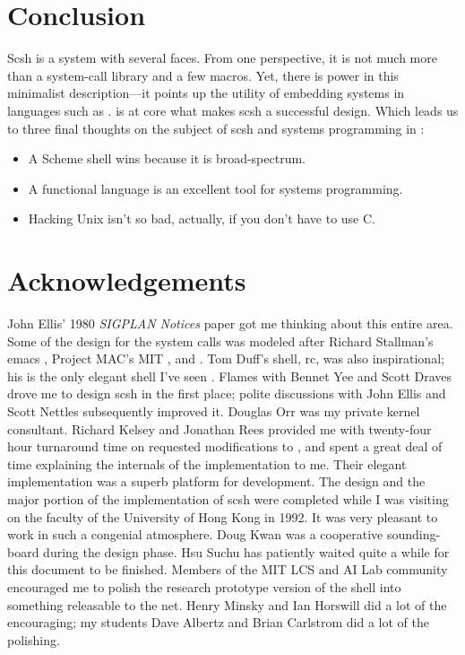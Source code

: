 \section{Conclusion}
Scsh is a system with several faces.
From one perspective,
it is not much more than a system-call library and
a few macros.
Yet, there is power in this minimalist description---it points up the
utility of embedding systems in languages such as {\Scheme}.
{\Scheme} is at core what makes scsh a successful design.
Which leads us to three final thoughts on the subject of scsh and
systems programming in {\Unix}:
\begin{itemize}
\item A Scheme shell wins because it is broad-spectrum.
\item A functional language is an excellent tool for systems programming.
\item Hacking Unix isn't so bad, actually, if you don't have to use C.
\end{itemize}


\section{Acknowledgements}
John Ellis' 1980 {\em SIGPLAN Notices\/} paper \cite{ellis} got me thinking
about this entire area.
Some of the design for the system calls was modeled after
Richard Stallman's emacs \cite{emacs}, 
Project MAC's MIT {\Scheme} \cite{c-scheme}, and {\CommonLisp} \cite{cltl2}.
Tom Duff's {\Unix} shell, rc, was also inspirational; 
his is the only elegant {\Unix} shell I've seen \cite{rc}.
Flames with Bennet Yee and Scott Draves drove me to design scsh in the
first place;
polite discussions with John Ellis and Scott Nettles subsequently improved it.
Douglas Orr was my private {\Unix} kernel consultant.
Richard Kelsey and Jonathan Rees provided me with twenty-four hour
turnaround time on requested modifications to {\scm}, and
spent a great deal of time explaining the internals of the implementation
to me.
Their elegant {\Scheme} implementation was a superb platform for development.
The design and the major portion of the implementation of scsh were completed
while I was visiting on the faculty of the University of Hong Kong
in 1992.
It was very pleasant to work in such a congenial atmosphere.
Doug Kwan was a cooperative sounding-board during the design phase.
Hsu Suchu has patiently waited quite a while for this document to
be finished.
Members of the MIT LCS and AI Lab community encouraged me to polish
the research prototype version of the shell into something releasable
to the net. 
Henry Minsky and Ian Horswill did a lot of the encouraging;
my students Dave Albertz and Brian Carlstrom did a lot of the polishing.

